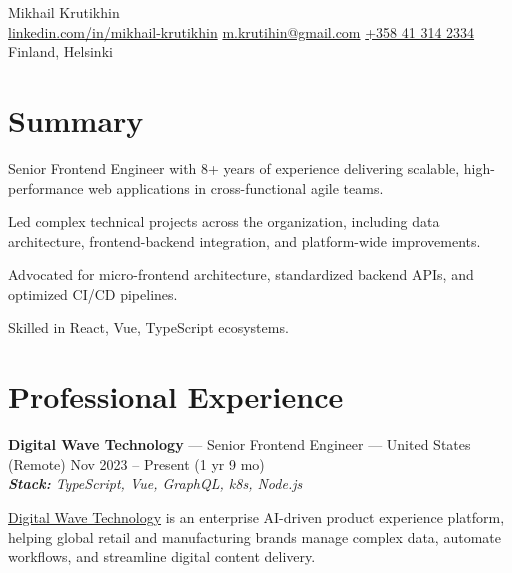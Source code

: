 \documentclass[a4paper,9pt]{article}
\begin{document}
\pagestyle{empty}

\begin{center}
    {\Huge Mikhail Krutikhin}\\
    \href{https://linkedin.com/in/mikhail-krutikhin}{linkedin.com/in/mikhail-krutikhin} \quad
    \href{mailto:m.krutihin@gmail.com}{m.krutihin@gmail.com} \quad
    \href{tel:+358413142334}{+358 41 314 2334} \quad
    Finland, Helsinki
\end{center}

\section{Summary}
Senior Frontend Engineer with 8+ years of experience delivering scalable, high-performance web applications in cross-functional agile teams.

Led complex technical projects across the organization, including data architecture, frontend-backend integration, and platform-wide improvements. 

Advocated for micro-frontend architecture, standardized backend APIs, and optimized CI/CD pipelines.

Skilled in React, Vue, TypeScript ecosystems.
\section{Professional Experience}

\textbf{Digital Wave Technology} --- Senior Frontend Engineer --- United States (Remote) \hfill Nov 2023 -- Present (1 yr 9 mo)\\
\textit{\textbf{Stack:} TypeScript, Vue, GraphQL, k8s, Node.js}

\href{https://www.digitalwavetechnology.com/}{Digital Wave Technology} is an enterprise AI-driven product experience platform, helping global retail and manufacturing brands manage complex data, automate workflows, and streamline digital content delivery.\\
\end{document}
